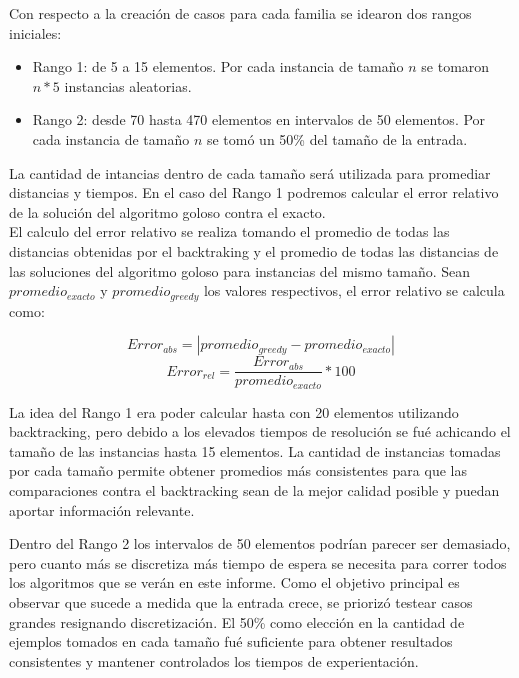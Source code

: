 Con respecto a la creación de casos para cada familia se idearon dos rangos iniciales:

\begin{itemize}
\item Rango 1: de 5 a 15 elementos. Por cada instancia de tamaño $n$ se tomaron $n*5$ instancias aleatorias.
\item Rango 2: desde 70 hasta 470 elementos en intervalos de 50 elementos. Por cada instancia de tamaño $n$ se tomó un 50\% del tamaño de la entrada. 
\end{itemize}

La cantidad de intancias dentro de cada tamaño será utilizada para promediar distancias y tiempos. En el caso del Rango 1 podremos calcular el error relativo de la solución del algoritmo goloso contra el exacto.\\

El calculo del error relativo se realiza tomando el promedio de todas las distancias obtenidas por el backtraking y el promedio de todas las distancias de las soluciones del algoritmo goloso para instancias del mismo tamaño. Sean $promedio_{exacto}$ y $promedio_{greedy}$ los valores respectivos, el error relativo se calcula como:

\begin{equation}
Error_{abs} = |promedio_{greedy}-promedio_{exacto}|
\end{equation}
\begin{equation}
Error_{rel} = \frac{Error_{abs}}{promedio_{exacto}} \ast 100
\end{equation}

La idea del Rango 1 era poder calcular hasta con 20 elementos utilizando backtracking, pero debido a los elevados tiempos de resolución se fué achicando el tamaño de las instancias hasta 15 elementos. La cantidad de instancias tomadas por cada tamaño permite obtener promedios más consistentes para que las comparaciones contra el backtracking sean de la mejor calidad posible y puedan aportar información relevante.

Dentro del Rango 2 los intervalos de 50 elementos podrían parecer ser demasiado, pero cuanto más se discretiza más tiempo de espera se necesita para correr todos los algoritmos que se verán en este informe. Como el objetivo principal es observar que sucede a medida que la entrada crece, se priorizó testear casos grandes resignando discretización.
El 50\% como elección en la cantidad de ejemplos tomados en cada tamaño fué suficiente para obtener resultados consistentes y mantener controlados los tiempos de experientación.

